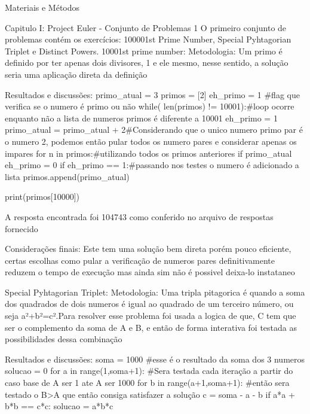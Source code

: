     Materiais e Métodos

Capitulo I: Project Euler - Conjunto de Problemas 1
    O primeiro conjunto de problemas contém os exercícios: 100001st Prime Number, Special Pyhtagorian Triplet e Distinct Powers.
    10001st prime number:
        Metodologia: 
            Um primo é definido por ter apenas dois divisores, 1 e ele mesmo, nesse sentido, a solução seria uma aplicação direta da definição

        Resultados e discussões:
            primo_atual = 3
            primos = [2]
            eh_primo = 1 #flag que verifica se o numero é primo ou não
            while( len(primos) != 10001):#loop ocorre enquanto não a lista de numeros primos é diferente a 10001
                eh_primo = 1
                primo_atual = primo_atual + 2#Considerando que o unico numero primo par é o numero 2, podemos então pular todos os numero pares e considerar apenas os impares
                for n in primos:#utilizando todos os primos anteriores
                    if primo_atual%
                        eh_primo = 0	
                if eh_primo == 1:#passando nos testes o numero é adicionado a lista
                    primos.append(primo_atual)
                    
            print(primos[10000])

            A resposta encontrada foi 104743 como conferido no arquivo de respostas fornecido

        Considerações finais:
            Este tem uma solução bem direta porém pouco eficiente, certas escolhas como pular a verificação de numeros pares definitivamente reduzem o tempo de execução mas ainda sim não é possivel deixa-lo instataneo

    Special Pyhtagorian Triplet:
        Metodologia:
	    Uma tripla pitagorica é quando a soma dos quadrados de dois numeros é igual ao quadrado de um terceiro número, ou seja a²+b²=c².Para resolver esse problema foi usada a logica de que, C tem que ser o complemento da soma de A e B, e então de forma interativa foi testada as possibilidades dessa combinação

        Resultados e discussões:
            soma = 1000 #esse é o resultado da soma dos 3 numeros
            solucao = 0
            for a in range(1,soma+1): #Sera testada cada iteração a partir do caso base de A ser 1 ate A ser 1000 
                for b in range(a+1,soma+1): #então sera testado o B>A que então consiga satisfazer a solução
                    c = soma - a - b
                    if a*a + b*b == c*c:
                        solucao = a*b*c

